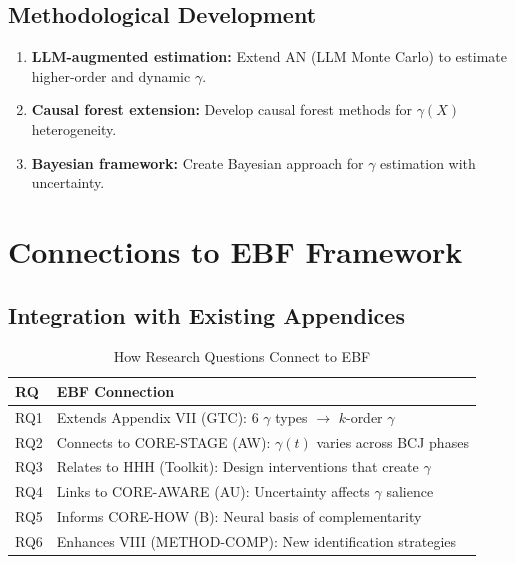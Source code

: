 \subsection{Methodological Development}

\begin{enumerate}
    \item \textbf{LLM-augmented estimation:} Extend AN (LLM Monte Carlo) to estimate higher-order and dynamic $\gamma$.

    \item \textbf{Causal forest extension:} Develop causal forest methods for $\gamma(X)$ heterogeneity.

    \item \textbf{Bayesian framework:} Create Bayesian approach for $\gamma$ estimation with uncertainty.
\end{enumerate}

\section{Connections to EBF Framework}
\label{sec:ebf-connections}

\subsection{Integration with Existing Appendices}

\begin{table}[h]
\centering
\caption{How Research Questions Connect to EBF}
\label{tab:ebf-connections}
\renewcommand{\arraystretch}{1.3}
\begin{tabular}{@{}lp{9cm}@{}}
\toprule
\textbf{RQ} & \textbf{EBF Connection} \\
\midrule
RQ1 & Extends Appendix VII (GTC): 6 $\gamma$ types $\to$ $k$-order $\gamma$ \\
RQ2 & Connects to CORE-STAGE (AW): $\gamma(t)$ varies across BCJ phases \\
RQ3 & Relates to HHH (Toolkit): Design interventions that create $\gamma$ \\
RQ4 & Links to CORE-AWARE (AU): Uncertainty affects $\gamma$ salience \\
RQ5 & Informs CORE-HOW (B): Neural basis of complementarity \\
RQ6 & Enhances VIII (METHOD-COMP): New identification strategies \\
\bottomrule
\end{tabular}
\end{table}

